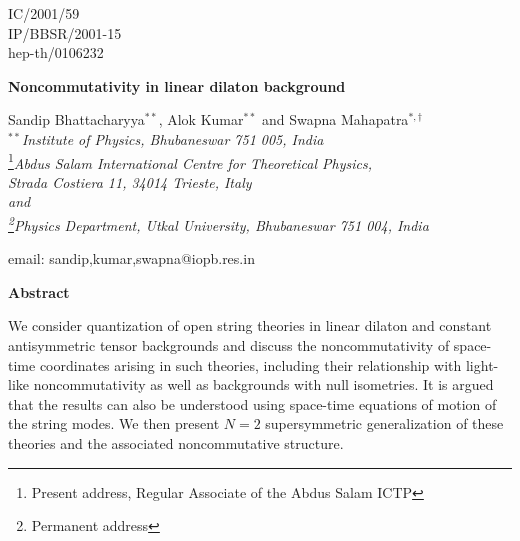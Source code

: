 \documentclass[a4paper,12pt]{article}
\begin{document}
\topmargin 0pt
\oddsidemargin 0mm

\renewcommand{\thefootnote}{\fnsymbol{footnote}}
\begin{titlepage}
\begin{flushright}
IC/2001/59 \\
IP/BBSR/2001-15\\
hep-th/0106232
\end{flushright}

\vspace{5mm}
\begin{center}
{\Large \bf Noncommutativity in linear dilaton background}
\vspace{10mm}

{\large
Sandip Bhattacharyya$^{**}$, Alok Kumar$^{**}$ and 
Swapna Mahapatra$^{*, \dag}$\\
\vspace{8mm}
$^{**}${\em Institute of Physics, Bhubaneswar 751 005, India}\\

\footnote{Present address, Regular Associate of the Abdus 
Salam ICTP}{\em Abdus Salam International Centre for Theoretical
Physics, \\
 Strada Costiera 11, 34014 Trieste, Italy \\
and \\
\footnote{Permanent address}Physics Department, Utkal University, 
Bhubaneswar 751 004, India}\\ 

\vspace{5mm}

email: sandip,kumar,swapna@iopb.res.in}

\end{center}
\vspace{5mm}
\centerline{{\bf{Abstract}}}
\vspace{5mm}


We consider quantization of open string theories in 
linear dilaton and constant antisymmetric tensor
backgrounds and discuss the noncommutativity of space-time 
coordinates arising in such theories, including their 
relationship with light-like noncommutativity as well as 
backgrounds with null isometries. 
It is argued that the results can also be understood using 
space-time equations of motion of the string modes. We then present 
$N=2$ supersymmetric generalization of 
these theories and the associated noncommutative
structure. 

\end{titlepage}
\end{document}

